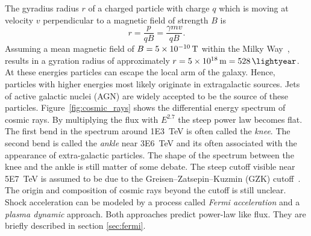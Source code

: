 The gyradius radius $r$ of a charged particle with charge $q$ which is moving at velocity $v$ perpendicular to a magnetic field of strength $B$ is
\begin{equation*}
  r = \frac {p}{ q B} = \frac{\gamma m v}{q B}.
\end{equation*}
Assuming a mean magnetic field of $B = \SI{5E-10}{T} $ within the Milky Way~\cite{haverkorn_magnetic}, results
in a gyration radius of approximately $r = \SI{5e18}{\metre} = \SI{528}{\lightyear}$. At these energies particles can escape
the local arm of the galaxy. Hence, particles with higher energies most likely originate in extragalactic sources.
Jets of active galactic nuclei (AGN) are widely accepted to be the source of these particles.
Figure~\ref{fig:cosmic_rays} shows the differential energy spectrum of cosmic rays.
By multiplying the flux with $E^{2.7}$ the steep power law becomes flat. The first bend in the spectrum around
\SI{1E3}{TeV} is often called the \emph{knee}. The second bend is called the \emph{ankle} near
\SI{3E6}{TeV} and its often associated with the appearance of extra-galactic particles. The shape of the spectrum
between the knee and the ankle is still matter of some debate. The steep cutoff visible near \SI{5E7}{TeV} is assumed to be due to the
Greisen–Zatsepin–Kuzmin (GZK) cutoff~\cite[209]{gaisser}. The origin and composition of cosmic rays beyond the cutoff is still unclear.
Shock acceleration can be modeled by a process called \emph{Fermi acceleration} and a \emph{plasma dynamic} approach.
Both approaches predict power-law like flux. They are briefly described in section \ref{sec:fermi}.

